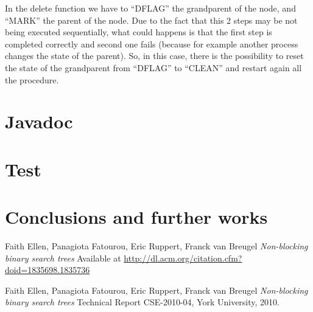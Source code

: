 \documentclass[a4paper]{article}
\begin{document}
In the delete function we have to ``DFLAG'' the grandparent of the node, and ``MARK'' the parent of the node. Due to the fact that this 2 steps may be not being executed sequentially, what could happens is that the first step is completed correctly and second one fails (because for example another process changes the state of the parent). So, in this case, there is the possibility to reset the state of the grandparent from ``DFLAG'' to ``CLEAN'' and restart again all the procedure.


\section{Javadoc}
\label{sec:javadoc}


\section{Test}
\label{sec:test}


\section{Conclusions and further works}
\label{sec:conclusions}





\begin{thebibliography}{5}

 Faith Ellen, Panagiota Fatourou, Eric Ruppert, Franck van Breugel
\textit{Non-blocking binary search trees} Available at
\url{http://dl.acm.org/citation.cfm?doid=1835698.1835736}

 Faith Ellen, Panagiota Fatourou, Eric Ruppert, Franck van Breugel
\textit{Non-blocking binary search trees} Technical Report CSE-2010-04, York University, 2010.

\end{thebibliography}
\end{document}

